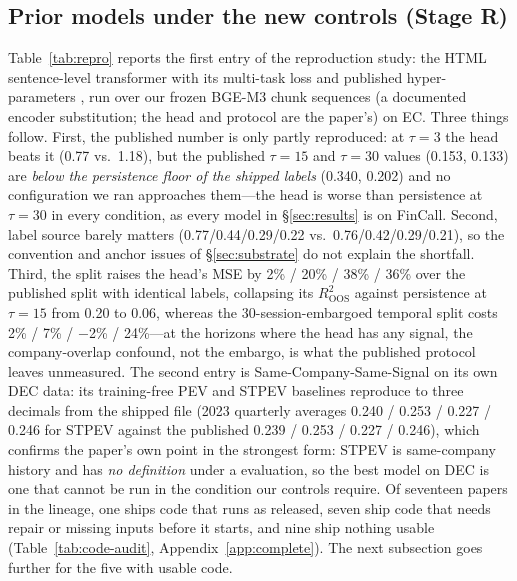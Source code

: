 \subsection{Prior models under the new controls (Stage R)}
\label{sec:results-repro}
Table~\ref{tab:repro} reports the first entry of the reproduction study: the HTML
sentence-level transformer with its multi-task loss and published hyper-parameters
\citep{yang2020html}, run over our frozen BGE-M3 chunk sequences (a documented
encoder substitution; the head and protocol are the paper's) on EC. Three things
follow. First, the published number is only partly reproduced: at $\tau{=}3$ the
head beats it (0.77 vs.\ 1.18), but the published $\tau{=}15$ and $\tau{=}30$
values (0.153, 0.133) are \emph{below the persistence floor of the shipped labels}
(0.340, 0.202) and no configuration we ran approaches them---the head is worse than
persistence at $\tau{=}30$ in every condition, as every model in
\S\ref{sec:results} is on FinCall. Second, label source barely matters
(0.77/0.44/0.29/0.22 vs.\ 0.76/0.42/0.29/0.21), so the convention and anchor
issues of \S\ref{sec:substrate} do not explain the shortfall. Third, the
\tickerdisjoint{} split raises the head's MSE by 2\% / 20\% / 38\% / 36\% over the
published split with identical labels, collapsing its $R^2_{\mathrm{OOS}}$ against
persistence at $\tau{=}15$ from 0.20 to 0.06, whereas the 30-session-embargoed
temporal split costs 2\% / 7\% / $-$2\% / 24\%---at the horizons where the head has
any signal, the company-overlap confound, not the embargo, is what the published
protocol leaves unmeasured. The second entry is Same-Company-Same-Signal \citep{scss2024} on its own DEC data: its training-free PEV and STPEV baselines reproduce to three decimals from the shipped file (2023 quarterly averages 0.240 / 0.253 / 0.227 / 0.246 for STPEV against the published 0.239 / 0.253 / 0.227 / 0.246), which confirms the paper's own point in the strongest form: STPEV is same-company history and has \emph{no definition} under a \tickerdisjoint{} evaluation, so the best model on DEC is one that cannot be run in the condition our controls require. Of seventeen papers in the lineage, one ships code that runs as released, seven ship code that needs repair or missing inputs before it starts, and nine ship nothing usable (Table~\ref{tab:code-audit}, Appendix~\ref{app:complete}). The next subsection goes further for the five with usable code.



